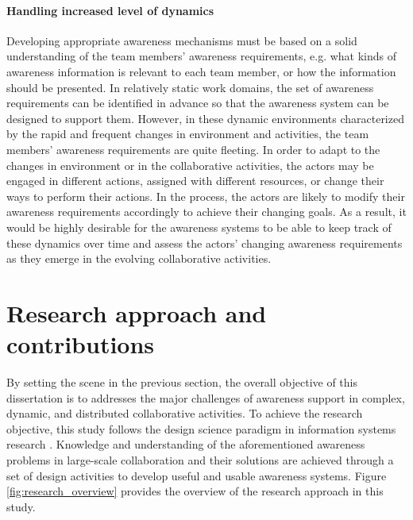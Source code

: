 \paragraph*{Handling increased level of dynamics} %
\label{par:handling_increased_level_of_dynamics}
Developing appropriate awareness mechanisms must be based on a solid understanding of the team members' awareness requirements, e.g. what kinds of awareness information is relevant to each team member, or how the information should be presented. In relatively static work domains, the set of awareness requirements can be identified in advance so that the awareness system can be designed to support them. However, in these dynamic environments characterized by the rapid and frequent changes in environment and activities, the team members' awareness requirements are quite fleeting. In order to adapt to the changes in environment or in the collaborative activities, the actors may be engaged in different actions, assigned with different resources, or change their ways to perform their actions. In the process, the actors are likely to modify their awareness requirements accordingly to achieve their changing goals. As a result, it would be highly desirable for the awareness systems to be able to keep track of these dynamics over time and assess the actors' changing awareness requirements as they emerge in the evolving collaborative activities.

\section{Research approach and contributions} %
\label{sec:research_approach_and_contributions}
By setting the scene in the previous section, the overall objective of this dissertation is to addresses the major challenges of awareness support in complex, dynamic, and distributed collaborative activities. To achieve the research objective, this study follows the design science paradigm in information systems research \cite{Hevner2004}. Knowledge and understanding of the aforementioned awareness problems in large-scale collaboration and their solutions are achieved through a set of design activities to develop useful and usable awareness systems. Figure \ref{fig:research_overview} provides the overview of the research approach in this study.

